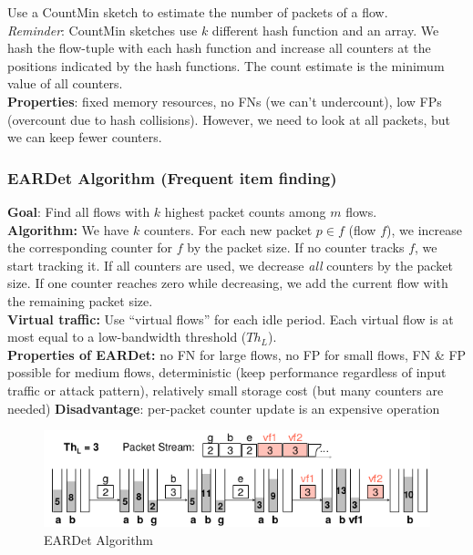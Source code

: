 \documentclass[11pt,oneside,a4paper]{article}
\begin{document}
Use a CountMin sketch to estimate the number of packets of a flow.\\
\textit{Reminder}: CountMin sketches use $k$ different hash function and an array. We hash the flow-tuple with each hash function and increase all counters at the positions indicated by the hash functions. The count estimate is the minimum value of all counters.\\
\textbf{Properties}: fixed memory resources, no FNs (we can't undercount), low FPs (overcount due to hash collisions). However, we need to look at all packets, but we can keep fewer counters.

\subsubsection{EARDet Algorithm (Frequent item finding)}

\textbf{Goal}: Find all flows with $k$ highest packet counts among $m$ flows.\\
\textbf{Algorithm:} We have $k$ counters. For each new packet $p \in f$ (flow $f$), we increase the corresponding counter for $f$ by the packet size. If no counter tracks $f$, we start tracking it. If all counters are used, we decrease \textit{all} counters by the packet size. If one counter reaches zero while decreasing, we add the current flow with the remaining packet size.\\
\textbf{Virtual traffic:} Use “virtual flows” for each idle period. Each virtual flow is at most equal to a low-bandwidth threshold ($Th_L$).\\

\noindent \textbf{Properties of EARDet:} no FN for large flows, no FP for small flows, FN \& FP possible for medium flows, deterministic (keep performance regardless of input traffic or attack pattern), relatively small storage cost (but many counters are needed)
\textbf{Disadvantage}: per-packet counter update is an expensive operation

\newpage

\begin{figure}[t!]
	\centering
	\includegraphics[width=0.5\linewidth]{figures/eardet_algorithm}
	\caption{EARDet Algorithm}
	\label{fig:eardetalgorithm}
\end{figure}
\end{document}
